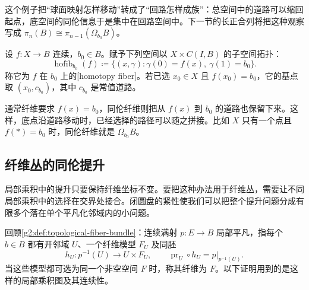 这个例子把“球面映射怎样移动”转成了“回路怎样成族”：总空间中的道路可以缩回起点，底空间的同伦信息于是集中在回路空间中。下一节的长正合列将把这种观察写成 \(\pi_n(B)\cong\pi_{n-1}(\Omega_{b_0}B)\)。

\begin{definition}[同伦纤维]\label{g2:def:homotopy-fiber}
	设 \(f:X\rightarrow B\) 连续，\(b_0\in B\)。赋予下列空间以 \(X\times C(I,B)\) 的子空间拓扑：
	\[
		\operatorname{hofib}_{b_0}(f)\coloneqq
		\{(x,\gamma):\gamma(0)=f(x),\ \gamma(1)=b_0\}.
	\]
	称它为 \(f\) 在 \(b_0\) 上的[homotopy fiber]。若已选 \(x_0\in X\) 且 \(f(x_0)=b_0\)，它的基点取 \((x_0,c_{b_0})\)，其中 \(c_{b_0}\) 是常值道路。
\end{definition}

通常纤维要求 \(f(x)=b_0\)，同伦纤维则把从 \(f(x)\) 到 \(b_0\) 的道路也保留下来。这样，底点沿道路移动时，已经选择的路径可以随之拼接。比如 \(X\) 只有一个点且 \(f(*)=b_0\) 时，同伦纤维就是 \(\Omega_{b_0}B\)。

\subsection{纤维丛的同伦提升}
\label{g2:subsec:0802:03}

局部乘积中的提升只要保持纤维坐标不变。要把这种办法用于纤维丛，需要让不同局部乘积中的选择在交界处接合。闭圆盘的紧性使我们可以把整个提升问题分成有限多个落在单个平凡化邻域内的小问题。

回顾\cref{g2:def:topological-fiber-bundle}：连续满射 \(p:E\to B\) 局部平凡，指每个 \(b\in B\) 都有开邻域 \(U\)、一个纤维模型 \(F_U\) 及同胚
\[
	h_U:p^{-1}(U)\longrightarrow U\times F_U,
	\qquad \operatorname{pr}_U\circ h_U=p|_{p^{-1}(U)}.
\]
当这些模型都可选为同一个非空空间 \(F\) 时，称其纤维为 \(F\)。以下证明用到的是这样的局部乘积图及其连续性。

